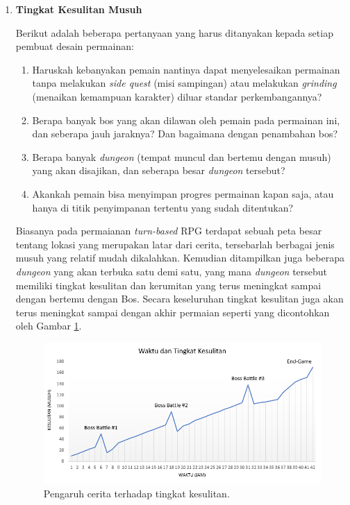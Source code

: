 \begin{subs}
	\begin{enumerate}[label=\textbf{\arabic*).}]
		
		\item \textbf{Tingkat Kesulitan Musuh}
		\setlength{\parindent}{0.8cm}
	
		Berikut adalah beberapa pertanyaan yang harus ditanyakan kepada setiap pembuat desain permainan:
		
		\begin{enumerate}[label=\alph*).]
			\item Haruskah kebanyakan pemain nantinya dapat menyelesaikan permainan tanpa melakukan \textit{side quest} (misi sampingan) atau melakukan \textit{grinding} (menaikan kemampuan karakter) diluar standar perkembangannya?
			\item Berapa banyak bos yang akan dilawan oleh pemain pada permainan ini, dan seberapa jauh jaraknya? Dan bagaimana dengan penambahan bos?
			\item Berapa banyak \textit{dungeon} (tempat muncul dan bertemu dengan musuh) yang akan disajikan, dan seberapa besar \textit{dungeon} tersebut?
			\item Akankah pemain bisa menyimpan progres permainan kapan saja, atau hanya di titik penyimpanan tertentu yang sudah ditentukan?
		\end{enumerate}
		\vspace{1ex}
	
		Biasanya pada permaianan \textit{turn-based} RPG terdapat sebuah peta besar tentang lokasi yang merupakan latar dari cerita, tersebarlah berbagai jenis musuh yang relatif mudah dikalahkan. Kemudian ditampilkan juga beberapa \textit{dungeon} yang akan terbuka satu demi satu, yang mana \textit{dungeon} tersebut memiliki tingkat kesulitan dan kerumitan yang terus meningkat sampai dengan bertemu dengan Bos. Secara keseluruhan tingkat kesulitan juga akan terus meningkat sampai dengan akhir permaian seperti yang dicontohkan oleh Gambar \ref{fig:story_dungeon}.
		
		\begin{figure} [!h] \centering
			\includegraphics[scale=0.75]{img/story_dungeon.png}
			\caption{Pengaruh cerita terhadap tingkat kesulitan.}
			\label{fig:story_dungeon}
		\end{figure}
		

\end{enumerate}
\end{subs}
